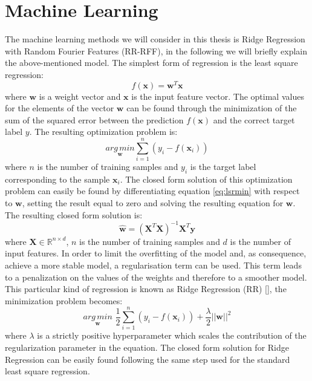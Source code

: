\section{Machine Learning}\label{sec:ML}
The machine learning methods we will consider in this thesis is Ridge Regression with Random Fourier Features (RR-RFF), in the following we will briefly explain the above-mentioned model.
The simplest form of regression is the least square regression:
\begin{equation}
    f(\mathbf{x}) = \mathbf{w}^T\mathbf{x}
    \label{eq:lsr}
\end{equation}
where $\mathbf{w}$ is a weight vector and $\mathbf{x}$ is the input feature vector.
The optimal values for the elements of the vector $\mathbf{w}$ can be found through the minimization of the sum of the squared error between the prediction $f(\mathbf{x})$ and the correct target label $y$. The resulting optimization problem is:
\begin{equation}
    \underset{\mathbf{w}}{arg\,min} \sum_{i=1}^{n} (y_i - f(\mathbf{x}_i))
    \label{eq:lsrmin}
\end{equation}
where $n$ is the number of training samples and $y_i$ is the target label corresponding to the sample $\mathbf{x}_i$. The closed form solution of this optimization problem can easily be found by differentiating equation \ref{eq:lsrmin} with respect to $\mathbf{w}$, setting the result equal to zero and solving the resulting equation for $\mathbf{w}$. The resulting closed form solution is:
\begin{equation}
    \hat{\mathbf{w}} = (\mathbf{X}^T \mathbf{X})^{-1} \mathbf{X}^T \mathbf{y}
    \label{eq:closedlsr}
\end{equation}
where $\mathbf{X} \in \mathbb{R}^{n \times d}$, $n$ is the number of training samples and $d$ is the number of input features. In order to limit the overfitting of the model and, as consequence, achieve a more stable model, a regularisation term can be used. This term leads to a penalization on the values of the weights and therefore to a smoother model. This particular kind of regression is known as Ridge Regression (RR) [\cite{hoerl1970ridge}], the minimization problem becomes:
\begin{equation}
    \underset{\mathbf{w}}{arg\,min} \,\, \frac{1}{2} \sum_{i=1}^{n} (y_i - f(\mathbf{x}_i)) + \frac{\lambda}{2} ||\mathbf{w}||^2
    \label{eq:lsrminreg}
\end{equation}
where $\lambda$ is a strictly positive hyperparameter which scales the contribution of the regularization parameter in the equation. The closed form solution for Ridge Regression can be easily found following the same step used for the standard least square regression.
